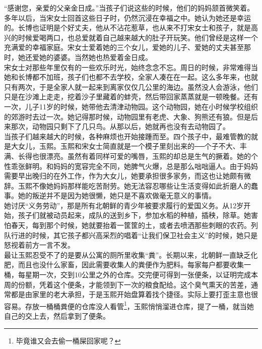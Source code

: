 \begin{multicols}{\theparacolNo}
“感谢您，亲爱的父亲金日成。”当孩子们说这些的时候，他们的妈妈颔首微笑着。\\

多年以后，当宋女士回首这些日子时，仍然沉浸在幸福之中。她认为她还是幸运的。长博也证明是个好丈夫，他从不沾花惹草，也从来不打宋女士和孩子，就是高兴的时候爱喝两口，也总爱就着自己越来越大的肚子开玩笑。他们曾经是这样一个充满爱的幸福家庭。宋女士爱着她的三个女儿，爱她的儿子、爱她的丈夫甚至那时，她还爱她的婆婆。当然她也热爱着金日成。\\

宋女士对那些年里仅有的一些欢乐时光，始终念念不忘。周日的时候，非常难得当她和长博都不加班，孩子们也都不去学校，全家人凑在在一起。这么多年来，也就只有两次，于是全家人就一起来到离家仅仅几公里的海边。虽然没人会游泳，他们只是在沙滩上走走，挖着沙子里藏着的蚌壳，然后带回家蒸蒸就是一顿晚餐。还有一次，儿子11岁的时候，她带他去清津动物园。这个动物园，她在小时候学校组织的郊游时去过一次。她记得那时候，动物园里有老虎、大象、狗熊还有狼。但是后来那次，动物园只剩下了几只鸟。从那以后，她就再也没有去动物园了。\\

当孩子们越来越大的时候，各种麻烦也开始接踵而至。四个孩子中，最难管教的就是大女儿，玉熙。玉熙和宋女士简直就是一个模子里刻出来的──个子不大、丰满、长得也很漂亮。虽然有着同样可爱的嘴唇，玉熙的却总是生气的撅着。她的个性乖张鲜明。和妈妈的宽容完全不同，她脾气火爆，总是那么咄咄逼人。由于妈妈需要早出晚归的在外工作，作为大女儿，她要承担很多家务，而这也让她颇有微辞。玉熙不像她妈妈那样能吃苦耐劳。她无法容忍哪些让生活变得如此折磨人的蠢事。她的叛逆并不是因为她很懒，她只是不喜欢做毫无意义的事情。\\

她讨厌“义务劳动”，那是所有北朝鲜的青少年被要求履行的爱国义务。从12岁开始，孩子们就被动员起来，成队的送到乡下，参加水稻的种植，插秧，除草。她害怕春天，每到那个时候，她就要抬着一筐筐的土，或者去喷洒那些刺眼的农药。列队行进的时候，其它孩子都兴高采烈的唱着“让我们保卫社会主义”的时候，她只是怒视着前方一言不发。\\

最让玉熙忍受不了的是要从公寓的厕所里收集“粪”。长期以来，北朝鲜一直缺乏化肥，而且也没什么家畜，因此需要收集人的粪便作为肥料。每家每户都要收集一桶，每星期一次，交到10公里之外的仓库。交完便可得到一张便条，以证明完成本周的份额，凭着这个便条，才能领到下一次的粮食配给。这个臭气熏天的苦差，通常都是由家里的老大承担，于是玉熙开始盘算着找个捷径。实际上要打歪主意也很容易。存放一桶桶粪便的仓库没人看管\footnote{毕竟谁又会去偷一桶屎回家呢？}，玉熙悄悄溜进仓库，提了一桶，就当她自己的交上去，然后拿到了便条。\\


\end{multicols}
